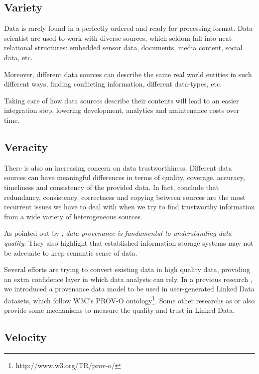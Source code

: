 \subsection{Variety}

Data is rarely found in a perfectly ordered and ready for processing format. Data scientist are used to work with diverse sources, which seldom fall into neat relational structures: embedded sensor data, documents, media content, social data, etc. 

Moreover, different data sources can describe the same real world entities in such different ways, finding conflicting information, different data-types, etc.

Taking care of how data sources describe their contents will lead to an easier integration step, lowering development, analytics and maintenance costs over time. 

\subsection{Veracity}

There is also an increasing concern on data trustworthiness. Different data sources can have meaningful differences in terms of quality, coverage, accuracy, timeliness and consistency of the provided data. In fact, \cite{xian_truth_2013} conclude that redundancy, consistency, correctness and copying between sources are the most recurrent issues we have to deal with when we try to find trustworthy information from a wide variety of heterogeneous sources.

As pointed out by \cite{buneman2013data}, \textit{data provenance is fundamental to understanding data quality}. They also highlight that established information storage systems may not be adecuate to keep semantic sense of data.

Several efforts are trying to convert existing data in high quality data, providing an extra confidence layer in which data analysts can rely. In a previous research \cite{emalditrust}, we introduced a provenance data model to be used in user-generated Linked Data datasets, which follow W3C's PROV-O ontology\footnote{http://www.w3.org/TR/prov-o/}. Some other researchs as \cite{hartig_using_2009} or \cite{bizer_quality_2009} also provide some mechanisms to measure the quality and trust in Linked Data.

\subsection{Velocity}

